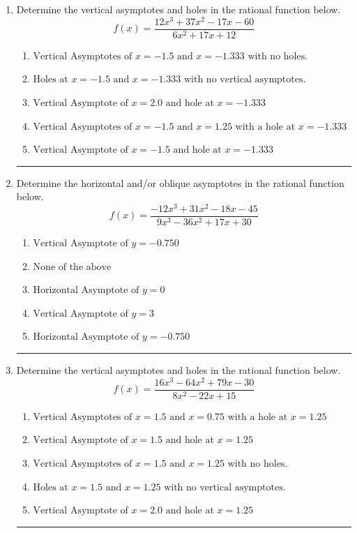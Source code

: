 \documentclass[14pt]{extbook}
\newcommand{\litem}[1]{\item#1\hspace*{-1cm}\rule{\textwidth}{0.4pt}}
\begin{document}
\begin{enumerate}
{\begin{enumerate}[label=\Alph*.]
\end{enumerate} }
\litem{
Determine the vertical asymptotes and holes in the rational function below.\[ f(x) = \frac{12x^{3} +37 x^{2} -17 x -60}{6x^{2} +17 x + 12} \]\begin{enumerate}[label=\Alph*.]
\item \( \text{Vertical Asymptotes of } x = -1.5 \text{ and } x = -1.333 \text{ with no holes.} \)
\item \( \text{Holes at } x = -1.5 \text{ and } x = -1.333 \text{ with no vertical asymptotes.} \)
\item \( \text{Vertical Asymptote of } x = 2.0 \text{ and hole at } x = -1.333 \)
\item \( \text{Vertical Asymptotes of } x = -1.5 \text{ and } x = 1.25 \text{ with a hole at } x = -1.333 \)
\item \( \text{Vertical Asymptote of } x = -1.5 \text{ and hole at } x = -1.333 \)

\end{enumerate} }
\litem{
Determine the horizontal and/or oblique asymptotes in the rational function below.\[ f(x) = \frac{-12x^{3} +31 x^{2} -18 x -45}{9x^{3} -36 x^{2} +17 x + 30} \]\begin{enumerate}[label=\Alph*.]
\item \( \text{Vertical Asymptote of } y = -0.750  \)
\item \( \text{None of the above} \)
\item \( \text{Horizontal Asymptote of } y = 0  \)
\item \( \text{Vertical Asymptote of } y = 3  \)
\item \( \text{Horizontal Asymptote of } y = -0.750  \)

\end{enumerate} }
\litem{
Determine the vertical asymptotes and holes in the rational function below.\[ f(x) = \frac{16x^{3} -64 x^{2} +79 x -30}{8x^{2} -22 x + 15} \]\begin{enumerate}[label=\Alph*.]
\item \( \text{Vertical Asymptotes of } x = 1.5 \text{ and } x = 0.75 \text{ with a hole at } x = 1.25 \)
\item \( \text{Vertical Asymptote of } x = 1.5 \text{ and hole at } x = 1.25 \)
\item \( \text{Vertical Asymptotes of } x = 1.5 \text{ and } x = 1.25 \text{ with no holes.} \)
\item \( \text{Holes at } x = 1.5 \text{ and } x = 1.25 \text{ with no vertical asymptotes.} \)
\item \( \text{Vertical Asymptote of } x = 2.0 \text{ and hole at } x = 1.25 \)


\end{enumerate}}
\end{enumerate}
\end{document}
